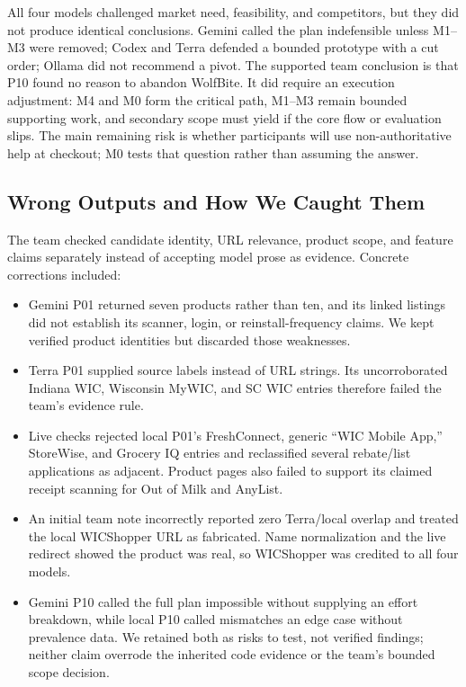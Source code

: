 \documentclass[sigconf]{acmart}
\begin{document}
All four models challenged market need, feasibility, and competitors, but they
did not produce identical conclusions. Gemini called the plan indefensible
unless M1--M3 were removed; Codex and Terra defended a bounded prototype with a
cut order; Ollama did not recommend a pivot. The supported team conclusion is
that P10 found no reason to abandon WolfBite. It did require an execution
adjustment: M4 and M0 form the critical path, M1--M3 remain bounded supporting
work, and secondary scope must yield if the core flow or evaluation slips. The
main remaining risk is whether participants will use non-authoritative help at
checkout; M0 tests that question rather than assuming the answer.

\subsection{Wrong Outputs and How We Caught Them}

The team checked candidate identity, URL relevance, product scope, and feature
claims separately instead of accepting model prose as evidence. Concrete
corrections included:

\begin{itemize}
  \item Gemini P01 returned seven products rather than ten, and its linked
  listings did not establish its scanner, login, or reinstall-frequency claims.
  We kept verified product identities but discarded those weaknesses.
  \item Terra P01 supplied source labels instead of URL strings. Its
  uncorroborated Indiana WIC, Wisconsin MyWIC, and SC WIC entries therefore
  failed the team's evidence rule.
  \item Live checks rejected local P01's FreshConnect, generic ``WIC Mobile
  App,'' StoreWise, and Grocery IQ entries and reclassified several rebate/list
  applications as adjacent. Product pages also failed to support its claimed
  receipt scanning for Out of Milk and AnyList.
  \item An initial team note incorrectly reported zero Terra/local overlap and
  treated the local WICShopper URL as fabricated. Name normalization and the
  live redirect showed the product was real, so WICShopper was credited to all
  four models.
  \item Gemini P10 called the full plan impossible without supplying an effort
  breakdown, while local P10 called mismatches an edge case without prevalence
  data. We retained both as risks to test, not verified findings; neither claim
  overrode the inherited code evidence or the team's bounded scope decision.
\end{itemize}
\end{document}
